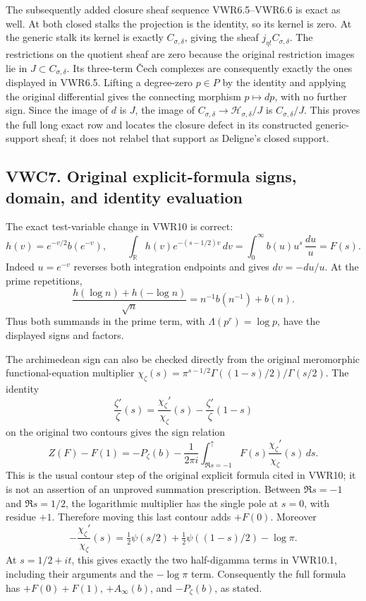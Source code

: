 The subsequently added closure sheaf sequence VWR6.5--VWR6.6 is exact as
well. At both closed stalks the projection is the identity, so its
kernel is zero. At the generic stalk its kernel is exactly
\(C_{\sigma,\delta}\), giving the sheaf \(j_{\eta!}C_{\sigma,\delta}\).
The restrictions on the quotient sheaf are zero because the original
restriction images lie in \(J\subset C_{\sigma,\delta}\). Its three-term
Čech complexes are consequently exactly the ones displayed in VWR6.5.
Lifting a degree-zero \(p\in P\) by the identity and applying the
original differential gives the connecting morphism \(p\mapsto dp\),
with no further sign. Since the image of \(d\) is \(J\), the image of
\(C_{\sigma,\delta}\to\mathcal H_{\sigma,\delta}/J\) is
\(C_{\sigma,\delta}/J\). This proves the full long exact row and locates
the closure defect in its constructed generic-support sheaf; it does not
relabel that support as Deligne's closed support.

\subsection{VWC7. Original explicit-formula signs, domain, and identity
evaluation}\label{vwc7.-original-explicit-formula-signs-domain-and-identity-evaluation}

The exact test-variable change in VWR10 is correct: \[
h(v)=e^{-v/2}b(e^{-v}),\qquad
\int_{\mathbb R}h(v)e^{-(s-1/2)v}\,dv
=\int_0^\infty b(u)u^s\,\frac{du}{u}=F(s).
\] Indeed \(u=e^{-v}\) reverses both integration endpoints and gives
\(dv=-du/u\). At the prime repetitions, \[
\frac{h(\log n)+h(-\log n)}{\sqrt n}
=n^{-1}b(n^{-1})+b(n).
\] Thus both summands in the prime term, with \(\Lambda(p^r)=\log p\),
have the displayed signs and factors.

The archimedean sign can also be checked directly from the original
meromorphic functional-equation multiplier
\(\chi_\zeta(s)=\pi^{s-1/2}\Gamma((1-s)/2)/\Gamma(s/2)\). The identity
\[
\frac{\zeta'}{\zeta}(s)
=\frac{\chi_\zeta'}{\chi_\zeta}(s)
 -\frac{\zeta'}{\zeta}(1-s)
\] on the original two contours gives the sign relation \[
Z(F)-F(1)
=-P_\zeta(b)
 -\frac1{2\pi i}\int_{\Re s=-1}^{\uparrow}
                 F(s)\frac{\chi_\zeta'}{\chi_\zeta}(s)\,ds.
\] This is the usual contour step of the original explicit formula cited
in VWR10; it is not an assertion of an unproved summation prescription.
Between \(\Re s=-1\) and \(\Re s=1/2\), the logarithmic multiplier has
the single pole at \(s=0\), with residue \(+1\). Therefore moving this
last contour adds \(+F(0)\). Moreover \[
-\frac{\chi_\zeta'}{\chi_\zeta}(s)
=\tfrac12\psi(s/2)+\tfrac12\psi((1-s)/2)-\log\pi.
\] At \(s=1/2+it\), this gives exactly the two half-digamma terms in
VWR10.1, including their arguments and the \(-\log\pi\) term.
Consequently the full formula has \(+F(0)+F(1)\), \(+A_\infty(b)\), and
\(-P_\zeta(b)\), as stated.

